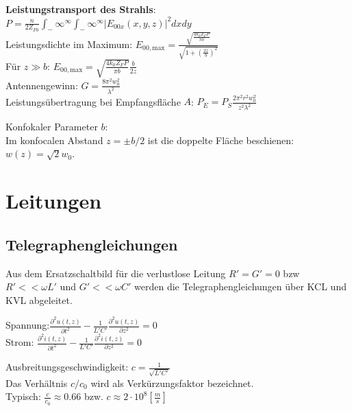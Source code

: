 \documentclass[english]{latex4ei/latex4ei_sheet}
\begin{document}
\begin{sectionbox}
    \textbf{Leistungstransport des Strahls}:\\
    $P = \frac{n}{2Z_{F0}}\int_-\infty^\infty\int_-\infty^\infty |E_{00x}(x,y,z)|^2 dxdy$\\
    Leistungsdichte im Maximum: $E_{00,\text{max}} = \frac{\sqrt{\frac{4k_0Z_FP}{\pi b}}}{\sqrt{1+\left(\frac{2z}{b}\right)^2}}$\\
    Für $z \gg b$: $E_{00,\text{max}} = \sqrt{\frac{4k_0Z_FP}{\pi b}}\frac{b}{2z}$\\
    Antennengewinn: $G = \frac{8\pi^2w_0^2}{\lambda^2}$\\
    Leistungsübertragung bei Empfangsfläche $A$: $P_E = P_S \frac{2\pi^2r^2w_0^2}{z^2\lambda^2}$

    Konfokaler Parameter $b$:\\
    Im konfocalen Abstand $z=\pm b/2$ ist die doppelte Fläche beschienen: $w(z) = \sqrt{2}w_0$.
\end{sectionbox}
\section{Leitungen}
\begin{sectionbox}
    \subsection{Telegraphengleichungen}
    Aus dem Ersatzschaltbild für die verlustlose Leitung $R'=G'=0$ bzw $R'<< \omega L'$ und $G' << \omega C'$ werden die Telegraphengleichungen über KCL und KVL abgeleitet.

    \begin{emphbox}
        Spannung:\qquad	$\frac{\partial^2 u(t,z)}{\partial t^2} - \frac{1}{L' C'} \frac{\partial^2 u(t,z)}{\partial z^2} = 0$\\
        Strom:	\qquad $\frac{\partial^2 i(t,z)}{\partial t^2} - \frac{1}{L' C'} \frac{\partial^2 i(t,z)}{\partial z^2} = 0$\\
    \end{emphbox}
    Ausbreitungsgeschwindigkeit: $c=\frac{1}{\sqrt{L' C'}}$\\
    Das Verhältnis $c/c_0$ wird als Verkürzungsfaktor bezeichnet.\\
    Typisch: $\frac{c}{c_0} \approx 0.66$ bzw. $c\approx 2 \cdot 10^8 [\frac{m}{s}]$\\

\end{sectionbox}
\end{document}
